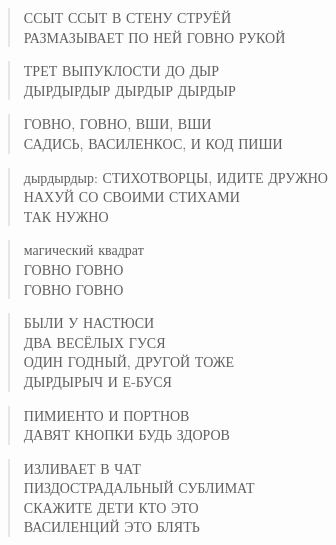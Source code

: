 \poemtitle{***}
\begin{verse}
ССЫТ ССЫТ В СТЕНУ СТРУЁЙ\\
РАЗМАЗЫВАЕТ ПО НЕЙ ГОВНО РУКОЙ
\end{verse}

\poemtitle{***}
\begin{verse}
ТРЕТ ВЫПУКЛОСТИ ДО ДЫР\\
ДЫРДЫРДЫР ДЫРДЫР ДЫРДЫР
\end{verse}

\poemtitle{***}
\begin{verse}
ГОВНО, ГОВНО, ВШИ, ВШИ\\
САДИСЬ, ВАСИЛЕНКОС, И КОД ПИШИ
\end{verse}

\poemtitle{***}
\begin{verse}
дырдырдыр: СТИХОТВОРЦЫ, ИДИТЕ ДРУЖНО\\
НАХУЙ СО СВОИМИ СТИХАМИ\\
ТАК НУЖНО
\end{verse}

\poemtitle{***}
\begin{verse}
магический квадрат\\
ГОВНО ГОВНО\\
ГОВНО ГОВНО
\end{verse}

\poemtitle{***}
\begin{verse}
БЫЛИ У НАСТЮСИ \\
ДВА ВЕСЁЛЫХ ГУСЯ\\
ОДИН ГОДНЫЙ, ДРУГОЙ ТОЖЕ\\
ДЫРДЫРЫЧ И Е-БУСЯ
\end{verse}

\poemtitle{***}
\begin{verse}
ПИМИЕНТО И ПОРТНОВ\\
ДАВЯТ КНОПКИ БУДЬ ЗДОРОВ
\end{verse}

\poemtitle{***}
\begin{verse}
ИЗЛИВАЕТ В ЧАТ\\
ПИЗДОСТРАДАЛЬНЫЙ СУБЛИМАТ\\
СКАЖИТЕ ДЕТИ КТО ЭТО\\
ВАСИЛЕНЦИЙ ЭТО БЛЯТЬ
\end{verse}

